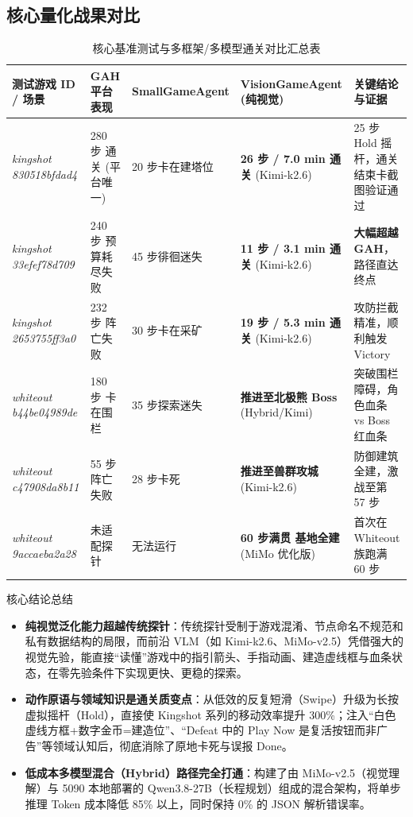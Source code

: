 \documentclass[11pt,a4paper]{ctexart}
\begin{document}
\subsection{核心量化战果对比}

\begin{table}[htbp]
\centering
\small
\caption{核心基准测试与多框架/多模型通关对比汇总表}
\label{tab:core_results}
\begin{tabular}{p{3.2cm}p{2.6cm}p{2.6cm}p{2.8cm}p{3.4cm}}
\toprule
\textbf{测试游戏 ID / 场景} & \textbf{GAH 平台表现} & \textbf{SmallGameAgent} & \textbf{VisionGameAgent (纯视觉)} & \textbf{关键结论与证据} \\
\midrule
\textit{kingshot 830518bfdad4} & 280 步 通关 (平台唯一) & 20 步卡在建塔位 & \textbf{26 步 / 7.0 min 通关} (Kimi-k2.6) & 25 步 Hold 摇杆，通关结束卡截图验证通过 \\
\textit{kingshot 33efef78d709} & 240 步 预算耗尽失败 & 45 步徘徊迷失 & \textbf{11 步 / 3.1 min 通关} (Kimi-k2.6) & \textbf{大幅超越 GAH}，路径直达终点 \\
\textit{kingshot 2653755ff3a0} & 232 步 阵亡失败 & 30 步卡在采矿 & \textbf{19 步 / 5.3 min 通关} (Kimi-k2.6) & 攻防拦截精准，顺利触发 Victory \\
\textit{whiteout b44be04989de} & 180 步 卡在围栏 & 35 步探索迷失 & \textbf{推进至北极熊 Boss} (Hybrid/Kimi) & 突破围栏障碍，角色血条 vs Boss 红血条 \\
\textit{whiteout c47908da8b11} & 55 步 阵亡失败 & 28 步卡死 & \textbf{推进至兽群攻城} (Kimi-k2.6) & 防御建筑全建，激战至第 57 步 \\
\textit{whiteout 9accaeba2a28} & 未适配探针 & 无法运行 & \textbf{60 步满贯 基地全建} (MiMo 优化版) & 首次在 Whiteout 族跑满 60 步 \\
\bottomrule
\end{tabular}
\end{table}

\begin{breakthroughbox}{核心结论总结}
\begin{itemize}
  \item \textbf{纯视觉泛化能力超越传统探针}：传统探针受制于游戏混淆、节点命名不规范和私有数据结构的局限，而前沿 VLM（如 Kimi-k2.6、MiMo-v2.5）凭借强大的视觉先验，能直接“读懂”游戏中的指引箭头、手指动画、建造虚线框与血条状态，在零先验条件下实现更快、更稳的探索。
  \item \textbf{动作原语与领域知识是通关质变点}：从低效的反复短滑（Swipe）升级为长按虚拟摇杆（Hold），直接使 Kingshot 系列的移动效率提升 300\%；注入“白色虚线方框+数字金币=建造位”、“Defeat 中的 Play Now 是复活按钮而非广告”等领域认知后，彻底消除了原地卡死与误报 Done。
  \item \textbf{低成本多模型混合（Hybrid）路径完全打通}：构建了由 MiMo-v2.5（视觉理解）与 5090 本地部署的 Qwen3.8-27B（长程规划）组成的混合架构，将单步推理 Token 成本降低 85\% 以上，同时保持 0\% 的 JSON 解析错误率。
\end{itemize}
\end{breakthroughbox}
\end{document}
